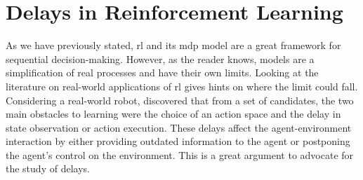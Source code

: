 \section{Delays in Reinforcement Learning}
\label{sec:why_delay_ns}

As we have previously stated, \gls{rl} and its \gls{mdp} model are a great framework for sequential decision-making.
However, as the reader knows, models are a simplification of real processes and have their own limits.
Looking at the literature on real-world applications of \gls{rl} gives hints on where the limit could fall.
Considering a real-world robot, \cite{mahmood2018setting} discovered that from a set of candidates, the two main obstacles to learning were the choice of an action space and the delay in state observation or action execution.
These delays affect the agent-environment interaction by either providing outdated information to the agent or postponing the agent's control on the environment.
This is a great argument to advocate for the study of delays.


